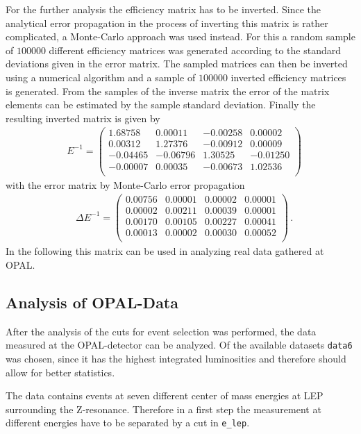 \documentclass[11pt, a4paper]{article}
\numberwithin{equation}{section}
\begin{document}
For the further analysis the efficiency matrix has to be inverted.
Since the analytical error propagation in the process of inverting this matrix is rather complicated, a Monte-Carlo approach was used instead.
For this a random sample of $\num{100000}$ different efficiency matrices was generated according to the standard deviations given in the error matrix.
The sampled matrices can then be inverted using a numerical algorithm and a sample of $\num{100000}$ inverted efficiency matrices is generated.
From the samples of the inverse matrix the error of the matrix elements can be estimated by the sample standard deviation.
Finally the resulting inverted matrix is given by
\begin{align*}
&E^{-1} = \begin{pmatrix}
	1.68758 & 0.00011 &-0.00258 & 0.00002 \\
	0.00312 & 1.27376 &-0.00912 & 0.00009 \\
   -0.04465 &-0.06796 & 1.30525 &-0.01250 \\
   -0.00007 & 0.00035 &-0.00673 & 1.02536 \\
\end{pmatrix}
\end{align*}
with the error matrix by Monte-Carlo error propagation
\begin{align*}
&\Delta E^{-1} = \begin{pmatrix}
	0.00756 & 0.00001 & 0.00002 & 0.00001 \\
	0.00002 & 0.00211 & 0.00039 & 0.00001 \\
	0.00170 & 0.00105 & 0.00227 & 0.00041 \\
	0.00013 & 0.00002 & 0.00030 & 0.00052 \\
\end{pmatrix} \,\text{.}
\end{align*}
In the following this matrix can be used in analyzing real data gathered at OPAL.

\subsection{Analysis of OPAL-Data}
After the analysis of the cuts for event selection was performed, the data measured at the OPAL-detector can be analyzed.
Of the available datasets \texttt{data6} was chosen, since it has the highest integrated luminosities and therefore should allow for better statistics.

The data contains events at seven different center of mass energies at LEP surrounding the Z-resonance.
Therefore in a first step the measurement at different energies have to be separated by a cut in \texttt{e\_lep}.
\end{document}

